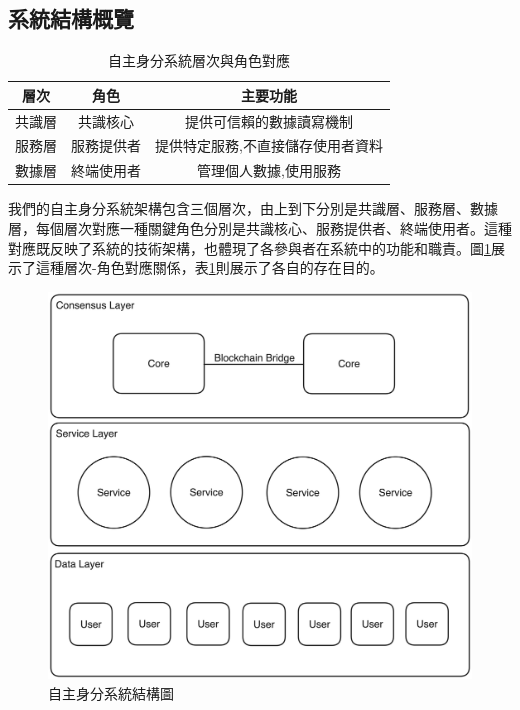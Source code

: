 \subsection{系統結構概覽}
\begin{table}[h]
  \centering
  \begin{tabular}{|c|c|c|}
    \hline
    層次  & 角色    & 主要功能              \\
    \hline
    共識層 & 共識核心  & 提供可信賴的數據讀寫機制      \\
    \hline
    服務層 & 服務提供者 & 提供特定服務,不直接儲存使用者資料 \\
    \hline
    數據層 & 終端使用者 & 管理個人數據,使用服務       \\
    \hline
  \end{tabular}
  \caption{自主身分系統層次與角色對應}
  \label{tab:system-layers}
\end{table}
我們的自主身分系統架構包含三個層次，由上到下分別是共識層、服務層、數據層，每個層次對應一種關鍵角色分別是共識核心、服務提供者、終端使用者。這種對應既反映了系統的技術架構，也體現了各參與者在系統中的功能和職責。圖\ref{fig:aid-system-layer}展示了這種層次-角色對應關係，表\ref{tab:system-layers}則展示了各自的存在目的。
\begin{figure}[h]
  \centering
  \includegraphics[width=\linewidth,keepaspectratio]{figures/aidLayers.png}
  \caption{自主身分系統結構圖}
  \label{fig:aid-system-layer}
\end{figure}
